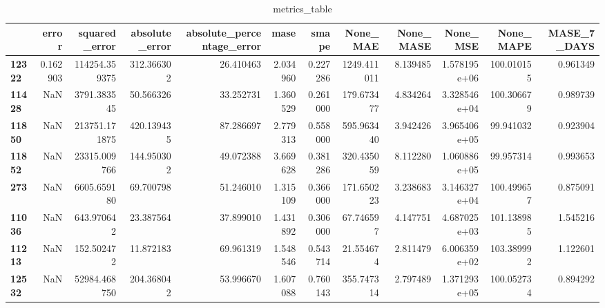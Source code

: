 \begin{table}[h]
\centering
\caption{metrics_table}
\label{table:Test wheather cnnaelstm and lstm used same parametesr for the experiment}
\begin{tabular}{lrrrrrrrrrrr}
\toprule
{} &     error &  squared\_error &  absolute\_error &  absolute\_percentage\_error &      mase &     smape &     None\_MAE &  None\_MASE &      None\_MSE &   None\_MAPE &  MASE\_7\_DAYS \\
\midrule
\textbf{12322} &  0.162903 &  114254.359375 &      312.366302 &                  26.410463 &  2.034960 &  0.227286 &  1249.411011 &   8.139485 &  1.578195e+06 &  100.010155 &     0.961349 \\
\textbf{11428} &       NaN &    3791.383545 &       50.566326 &                  33.252731 &  1.360529 &  0.261000 &   179.673477 &   4.834264 &  3.328546e+04 &  100.306679 &     0.989739 \\
\textbf{11850} &       NaN &  213751.171875 &      420.139435 &                  87.286697 &  2.779313 &  0.558000 &   595.963440 &   3.942426 &  3.965406e+05 &   99.941032 &     0.923904 \\
\textbf{11852} &       NaN &   23315.009766 &      144.950302 &                  49.072388 &  3.669628 &  0.381286 &   320.435059 &   8.112280 &  1.060886e+05 &   99.957314 &     0.993653 \\
\textbf{273  } &       NaN &    6605.659180 &       69.700798 &                  51.246010 &  1.315109 &  0.366000 &   171.650223 &   3.238683 &  3.146327e+04 &  100.499657 &     0.875091 \\
\textbf{11036} &       NaN &     643.970642 &       23.387564 &                  37.899010 &  1.431892 &  0.306000 &    67.746597 &   4.147751 &  4.687025e+03 &  101.138985 &     1.545216 \\
\textbf{11213} &       NaN &     152.502472 &       11.872183 &                  69.961319 &  1.548546 &  0.543714 &    21.554674 &   2.811479 &  6.006359e+02 &  103.389992 &     1.122601 \\
\textbf{12532} &       NaN &   52984.468750 &      204.368042 &                  53.996670 &  1.607088 &  0.760143 &   355.747314 &   2.797489 &  1.371293e+05 &  100.052734 &     0.894292 \\
\bottomrule
\end{tabular}
\end{table}
